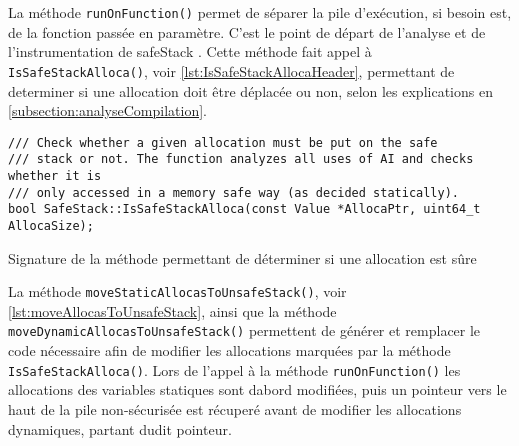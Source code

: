 La méthode \texttt{runOnFunction()} permet de séparer la pile d'exécution, si besoin est, de la fonction passée en paramètre. C'est le point de départ de l'analyse et de l'instrumentation de \og \gls{safeStack} \fg. Cette méthode fait appel à \texttt{IsSafeStackAlloca()}, voir \autoref{lst:IsSafeStackAllocaHeader}, permettant de determiner si une allocation doit être déplacée ou non, selon les explications en \autoref{subsection:analyseCompilation}.

\begin{listing}
	\begin{verbatim}
/// Check whether a given allocation must be put on the safe
/// stack or not. The function analyzes all uses of AI and checks whether it is
/// only accessed in a memory safe way (as decided statically).
bool SafeStack::IsSafeStackAlloca(const Value *AllocaPtr, uint64_t AllocaSize);
	\end{verbatim}
	\caption{Signature de la méthode permettant de déterminer si une allocation est sûre}
	\label{lst:IsSafeStackAllocaHeader}
\end{listing}

La méthode \texttt{moveStaticAllocasToUnsafeStack()}, voir \autoref{lst:moveAllocasToUnsafeStack}, ainsi que la méthode  \texttt{moveDynamicAllocasToUnsafeStack()} permettent de générer et remplacer le code nécessaire afin de modifier les allocations marquées par la méthode \texttt{IsSafeStackAlloca()}. Lors de l'appel à la méthode \texttt{runOnFunction()} les allocations des variables statiques sont dabord modifiées, puis un pointeur vers le haut de la pile non-sécurisée est récuperé avant de modifier les allocations dynamiques, partant dudit pointeur.


